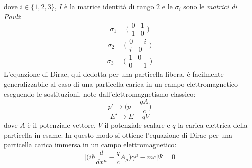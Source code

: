 dove $i \in \{1,2,3\}$, $I$ è la matrice identità di rango $2$ e le $\sigma_i$ sono le \emph{matrici di Pauli}:
\begin{equation}\label{sigma1}
 \sigma_1 = \Big(\begin{matrix} 0 & 1 \\ 1 & 0 \end{matrix}\Big)
\end{equation}
\begin{equation}\label{sigma2}
 \sigma_2 = \Big(\begin{matrix} 0 & -i \\ i & 0 \end{matrix}\Big)
\end{equation}
\begin{equation}\label{sigma3}
 \sigma_3 = \Big(\begin{matrix} 1 & 0 \\ 0 & -1 \end{matrix}\Big)
\end{equation}
L'equazione di Dirac, qui dedotta per una particella libera, è facilmente generalizzabile al caso di una particella carica in un campo elettromagnetico
eseguendo le sostituzioni, note dall'elettromagnetismo classico:
\begin{equation}
 p' \rightarrow \Big(p-\frac{qA}{c}\Big)
\end{equation}
\begin{equation}
 E' \rightarrow E - qV
\end{equation}
dove $A$ è il potenziale vettore, $V$ il potenziale scalare e $q$ la carica elettrica della particella in esame.
In questo modo si ottiene l'equazione di Dirac per una particella carica immersa in un campo elettromagnetico:
\begin{equation}
 \Big[\Big(i\hbar\frac{d}{dx^\mu}-\frac{q}{c}A_\mu\Big) \gamma^\mu - mc\Big] \Psi = 0
\end{equation} \cite{Bransden}


